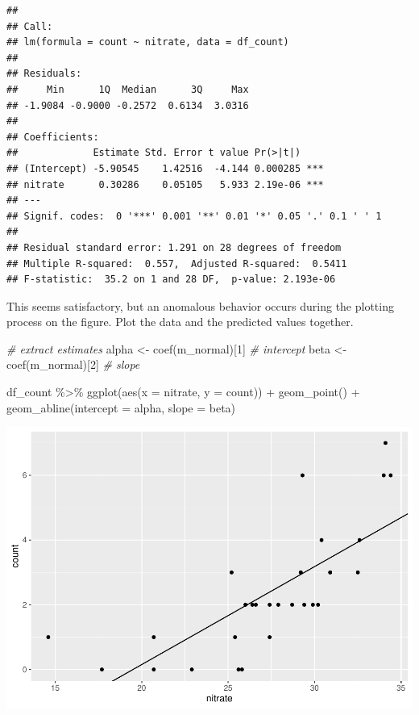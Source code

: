 \documentclass[
]{book}
\newenvironment{Shaded}{\begin{snugshade}}{\end{snugshade}}
\newcommand{\AttributeTok}[1]{\textcolor[rgb]{0.77,0.63,0.00}{#1}}
\newcommand{\CommentTok}[1]{\textcolor[rgb]{0.56,0.35,0.01}{\textit{#1}}}
\newcommand{\DecValTok}[1]{\textcolor[rgb]{0.00,0.00,0.81}{#1}}
\newcommand{\FunctionTok}[1]{\textcolor[rgb]{0.00,0.00,0.00}{#1}}
\newcommand{\NormalTok}[1]{#1}
\newcommand{\OtherTok}[1]{\textcolor[rgb]{0.56,0.35,0.01}{#1}}
\newcommand{\SpecialCharTok}[1]{\textcolor[rgb]{0.00,0.00,0.00}{#1}}
\begin{document}
\begin{verbatim}
## 
## Call:
## lm(formula = count ~ nitrate, data = df_count)
## 
## Residuals:
##     Min      1Q  Median      3Q     Max 
## -1.9084 -0.9000 -0.2572  0.6134  3.0316 
## 
## Coefficients:
##             Estimate Std. Error t value Pr(>|t|)    
## (Intercept) -5.90545    1.42516  -4.144 0.000285 ***
## nitrate      0.30286    0.05105   5.933 2.19e-06 ***
## ---
## Signif. codes:  0 '***' 0.001 '**' 0.01 '*' 0.05 '.' 0.1 ' ' 1
## 
## Residual standard error: 1.291 on 28 degrees of freedom
## Multiple R-squared:  0.557,  Adjusted R-squared:  0.5411 
## F-statistic:  35.2 on 1 and 28 DF,  p-value: 2.193e-06
\end{verbatim}

This seems satisfactory, but an anomalous behavior occurs during the plotting process on the figure. Plot the data and the predicted values together.

\begin{Shaded}
\begin{Highlighting}[]
\CommentTok{\# extract estimates}
\NormalTok{alpha }\OtherTok{\textless{}{-}} \FunctionTok{coef}\NormalTok{(m\_normal)[}\DecValTok{1}\NormalTok{] }\CommentTok{\# intercept}
\NormalTok{beta }\OtherTok{\textless{}{-}} \FunctionTok{coef}\NormalTok{(m\_normal)[}\DecValTok{2}\NormalTok{] }\CommentTok{\# slope}

\NormalTok{df\_count }\SpecialCharTok{\%\textgreater{}\%} 
  \FunctionTok{ggplot}\NormalTok{(}\FunctionTok{aes}\NormalTok{(}\AttributeTok{x =}\NormalTok{ nitrate,}
             \AttributeTok{y =}\NormalTok{ count)) }\SpecialCharTok{+}
  \FunctionTok{geom\_point}\NormalTok{() }\SpecialCharTok{+}
  \FunctionTok{geom\_abline}\NormalTok{(}\AttributeTok{intercept =}\NormalTok{ alpha,}
              \AttributeTok{slope =}\NormalTok{ beta)}
\end{Highlighting}
\end{Shaded}

\begin{center}\includegraphics{biostats_files/figure-latex/unnamed-chunk-59-1} \end{center}
\end{document}
